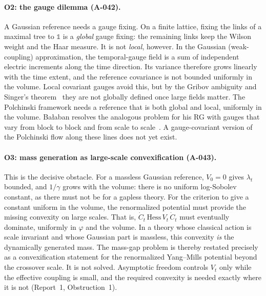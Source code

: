 \documentclass[11pt,a4paper]{article}
\newcommand{\idref}[1]{\textsf{#1}}
\begin{document}
\paragraph{O2: the gauge dilemma (\idref{A-042}).} A Gaussian reference needs a gauge fixing. On a finite lattice, fixing the links of a maximal tree to $\mathbb 1$ is a \emph{global} gauge fixing: the remaining links keep the Wilson weight and the Haar measure. It is not \emph{local}, however. In the Gaussian (weak-coupling) approximation, the temporal-gauge field is a sum of independent electric increments along the time direction. Its variance therefore grows linearly with the time extent, and the reference covariance is not bounded uniformly in the volume. Local covariant gauges avoid this, but by the Gribov ambiguity and Singer's theorem~\cite{Gri78,Sin78} they are not globally defined once large fields matter. The Polchinski framework needs a reference that is both global and local, uniformly in the volume. Ba{\l}aban resolves the analogous problem for his RG with gauges that vary from block to block and from scale to scale~\cite{Bal87}. A gauge-covariant version of the Polchinski flow along these lines does not yet exist.

\paragraph{O3: mass generation as large-scale convexification (\idref{A-043}).} This is the decisive obstacle. For a massless Gaussian reference, $V_0=0$ gives $\lambda_t$ bounded, and $1/\gamma$ grows with the volume: there is no uniform log-Sobolev constant, as there must not be for a gapless theory. For the criterion to give a constant uniform in the volume, the renormalized potential must provide the missing convexity on large scales. That is, $\dot C_t\,\mathrm{Hess}\,V_t\,\dot C_t$ must eventually dominate, uniformly in $\varphi$ and the volume. In a theory whose classical action is scale invariant and whose Gaussian part is massless, this convexity \emph{is} the dynamically generated mass. The mass-gap problem is thereby restated precisely as a convexification statement for the renormalized Yang--Mills potential beyond the crossover scale. It is not solved. Asymptotic freedom controls $V_t$ only while the effective coupling is small, and the required convexity is needed exactly where it is not (Report~1, Obstruction~1).
\end{document}

